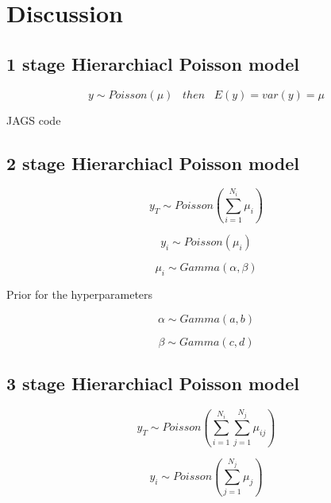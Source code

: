 \chapter{Discussion}\label{chap:Conclusion}

\section{1 stage Hierarchiacl Poisson model}

	\begin{equation}\nonumber
	y \sim Poisson(\mu) \;\;\; then \;\;\; E(y) = var(y) =\mu
	\end{equation}
	
	JAGS code




\section{2 stage Hierarchiacl Poisson model}

	\begin{equation}\nonumber
	y_T \sim Poisson(\sum_{i=1}^{N_i} \mu_i) 
	\end{equation}

	\begin{equation}\nonumber
	y_i \sim Poisson(\mu_i) 
	\end{equation}

	\begin{equation}\nonumber
	\mu_i \sim Gamma(\alpha,\beta) 
	\end{equation}

	Prior for the hyperparameters

	\begin{equation}\nonumber
	\alpha \sim Gamma(a,b) 
	\end{equation}

	\begin{equation}\nonumber
	\beta \sim Gamma(c,d) 
	\end{equation}
	
\section{3 stage Hierarchiacl Poisson model}

	\begin{equation}\nonumber
	y_T \sim Poisson(\sum_{i=1}^{N_i} \sum_{j=1}^{N_j}\mu_{ij}) 
	\end{equation}

	\begin{equation}\nonumber
	y_i \sim Poisson( \sum_{j=1}^{N_j}\mu_{j}) 
	\end{equation}
	
